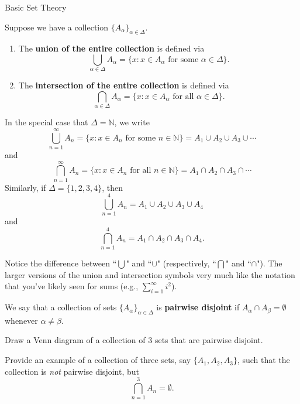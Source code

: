 \begin{section}{Basic Set Theory}
\begin{definition}
Suppose we have a collection \(\{A_{\alpha}\}_{\alpha\in\Delta}\).

\begin{enumerate}
\item The \textbf{union of the entire collection} is defined via
\[
\bigcup_{\alpha\in\Delta} A_{\alpha}=\{x:x\in A_{\alpha} \mbox{ for some }\alpha\in \Delta\}.
\]

\item The \textbf{intersection of the entire collection} is defined via
\[
\bigcap_{\alpha\in\Delta} A_{\alpha}=\{x:x\in A_{\alpha} \mbox{ for all }\alpha\in \Delta\}.
\]
\end{enumerate}
\end{definition}

\begin{example} 
In the special case that \(\Delta=\mathbb{N}\), we write
\[
\bigcup_{n=1}^{\infty}A_n= \{ x : x \in A_n \mbox{ for some } n \in \mathbb{N}\}= A_1\cup A_2 \cup A_3 \cup \cdots
\] 
and
\[
\bigcap_{n=1}^{\infty}A_n= \{ x : x \in A_n \mbox{ for all } n \in \mathbb{N}\} = A_1\cap A_2 \cap A_3 \cap \cdots
\] 
Similarly, if \(\Delta=\{1,2,3,4\}\), then
\[
\bigcup_{n=1}^{4}A_n= A_1\cup A_2 \cup A_3 \cup A_4
\] 
and
\[
\bigcap_{n=1}^{4}A_n= A_1\cap A_2 \cap A_3 \cap A_4.
\] 
\end{example}

\begin{remark}
Notice the difference between ``\(\bigcup\)" and ``\(\cup\)" (respectively, ``\(\bigcap\)" and ``\(\cap\)").  The larger versions of the union and intersection symbols very much like the notation that you've likely seen for sums (e.g., \(\displaystyle \sum_{i=1}^\infty i^2\)).
\end{remark}

\begin{definition}
We say that a collection of sets \(\{A_{\alpha}\}_{\alpha\in\Delta}\) is \textbf{pairwise disjoint} if \(A_{\alpha} \cap A_{\beta}=\emptyset\) whenever \(\alpha\neq \beta\).
\end{definition}

\begin{exercise}
Draw a Venn diagram of a collection of 3 sets that are pairwise disjoint.
\end{exercise}

\begin{exercise}
Provide an example of a collection of three sets, say \(\{A_1, A_2, A_3\}\), such that the collection is \emph{not} pairwise disjoint, but 
\[
\bigcap_{n=1}^3 A_n=\emptyset.
\]
\end{exercise}


\end{section}

